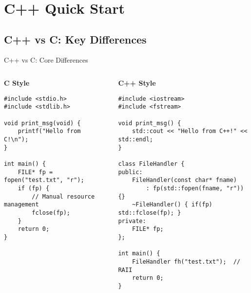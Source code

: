 \section{C++ Quick Start}

\subsection{C++ vs C: Key Differences}
\begin{frame}[fragile]{ C++ vs C: Core Differences}
	\begin{columns}
		\begin{column}{0.5\textwidth}
			\textbf{C Style}
			\begin{verbatim}
#include <stdio.h>
#include <stdlib.h>

void print_msg(void) {
    printf("Hello from C!\n");
}

int main() {
    FILE* fp = fopen("test.txt", "r");
    if (fp) {
        // Manual resource management
        fclose(fp);
    }
    return 0;
}
			\end{verbatim}
		\end{column}
		\begin{column}{0.5\textwidth}
			\textbf{C++ Style}
			\begin{verbatim}
#include <iostream>
#include <fstream>

void print_msg() {
    std::cout << "Hello from C++!" << std::endl;
}

class FileHandler {
public:
    FileHandler(const char* fname)
        : fp(std::fopen(fname, "r")) {}
    ~FileHandler() { if(fp) std::fclose(fp); }
private:
    FILE* fp;
};

int main() {
    FileHandler fh("test.txt");  // RAII
    return 0;
}
			\end{verbatim}
		\end{column}
	\end{columns}
\end{frame}

